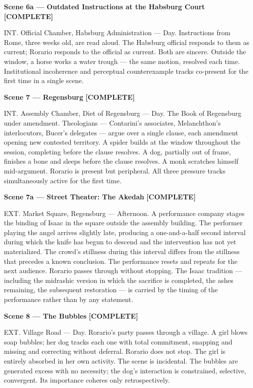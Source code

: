 \documentclass[12pt, oneside]{amsart}
\newcommand{\statuscomplete}{{\small\bfseries\color{complete}[COMPLETE]}}
\begin{document}
\bigskip

\noindent\textbf{Scene 6a --- Outdated Instructions at the Habsburg Court} \statuscomplete

\noindent INT. Official Chamber, Habsburg Administration --- Day. Instructions from Rome, three weeks old, are read aloud. The Habsburg official responds to them as current; Rorario responds to the official as current. Both are sincere. Outside the window, a horse works a water trough --- the same motion, resolved each time. Institutional incoherence and perceptual counterexample tracks co-present for the first time in a single scene.

\bigskip

\noindent\textbf{Scene 7 --- Regensburg} \statuscomplete

\noindent INT. Assembly Chamber, Diet of Regensburg --- Day. The Book of Regensburg under amendment. Theologians --- Contarini's associates, Melanchthon's interlocutors, Bucer's delegates --- argue over a single clause, each amendment opening new contested territory. A spider builds at the window throughout the session, completing before the clause resolves. A dog, partially out of frame, finishes a bone and sleeps before the clause resolves. A monk scratches himself mid-argument. Rorario is present but peripheral. All three pressure tracks simultaneously active for the first time.

\bigskip

\noindent\textbf{Scene 7a --- Street Theater: The Akedah} \statuscomplete

\noindent EXT. Market Square, Regensburg --- Afternoon. A performance company stages the binding of Isaac in the square outside the assembly building. The performer playing the angel arrives slightly late, producing a one-and-a-half second interval during which the knife has begun to descend and the intervention has not yet materialized. The crowd's stillness during this interval differs from the stillness that precedes a known conclusion. The performance resets and repeats for the next audience. Rorario passes through without stopping. The Isaac tradition --- including the midrashic version in which the sacrifice is completed, the ashes remaining, the subsequent restoration --- is carried by the timing of the performance rather than by any statement.

\bigskip

\noindent\textbf{Scene 8 --- The Bubbles} \statuscomplete

\noindent EXT. Village Road --- Day. Rorario's party passes through a village. A girl blows soap bubbles; her dog tracks each one with total commitment, snapping and missing and correcting without deferral. Rorario does not stop. The girl is entirely absorbed in her own activity. The scene is incidental. The bubbles are generated excess with no necessity; the dog's interaction is constrained, selective, convergent. Its importance coheres only retrospectively.
\end{document}
